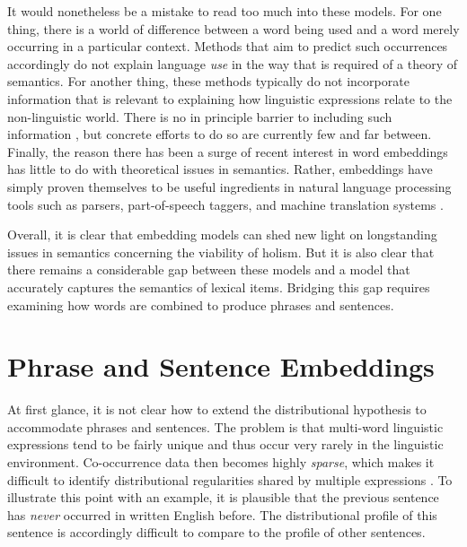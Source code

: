 It would nonetheless be a mistake to read too much into these models. For one thing, there is a world of difference between a word being used and a word merely occurring in a particular context. Methods that aim to predict such occurrences accordingly do not explain language \textit{use} in the way that is required of a theory of semantics. For another thing, these methods typically do not incorporate information that is relevant to explaining how linguistic expressions relate to the non-linguistic world. There is no in principle barrier to including such information \citep{Baroni:2014,LandauerDumais:1997}, but concrete efforts to do so are currently few and far between. Finally, the reason there has been a surge of recent interest in word embeddings has little to do with theoretical issues in semantics. Rather, embeddings have simply proven themselves to be useful ingredients in natural language processing tools such as parsers, part-of-speech taggers, and machine translation systems \citep{Manning:2015}. 

Overall, it is clear that embedding models can shed new light on longstanding issues in semantics concerning the viability of holism. But it is also clear that there remains a considerable gap between these models and a model that accurately captures the semantics of lexical items. Bridging this gap requires examining how words are combined to produce phrases and sentences.

\section{Phrase and Sentence Embeddings}

At first glance, it is not clear how to extend the distributional hypothesis to accommodate phrases and sentences. The problem is that multi-word linguistic expressions tend to be fairly unique and thus occur very rarely in the linguistic environment. Co-occurrence data then becomes highly \textit{sparse}, which makes it difficult to identify distributional regularities shared by multiple expressions \citep{Baroni:2014}. To illustrate this point with an example, it is plausible that the previous sentence has \textit{never} occurred in written English before. The distributional profile of this sentence is accordingly difficult to compare to the profile of other sentences. 

